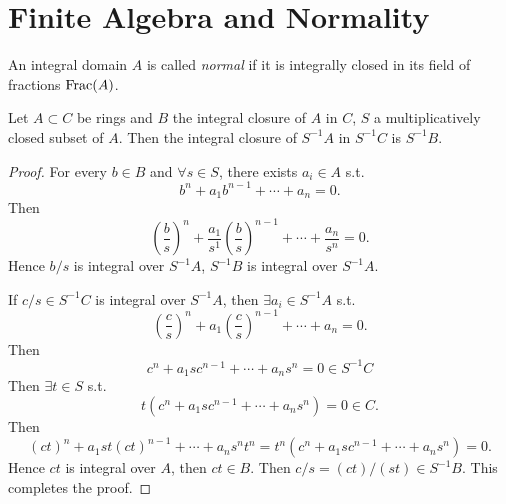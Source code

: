 \section{Finite Algebra and Normality }


    \begin{definition}\label{def: normal domain}
        An integral domain $A$ is called \textit{normal} if it is integrally closed in its field of fractions $\operatorname{Frac}(A)$.
    \end{definition}

    \begin{lemma}\label{lem: integral closed under localization}
        Let $A \subset C$ be rings and $B$ the integral closure of $A$ in $C$, $S$ a multiplicatively closed subset of $A$.
        Then the integral closure of  $S^{-1}A$ in $S^{-1}C$ is $S^{-1}B$.
    \end{lemma}
    \begin{proof}
            For every $b \in B$ and $\forall s \in S$, there exists $a_i \in A$ s.t. 
            \[ 
                b^n + a_1 b^{n-1} + \cdots + a_n = 0.
            \] 
            Then 
            \[ 
                \left( \frac{b}{s} \right)^n + \frac{a_1}{s^1} \left( \frac{b}{s} \right)^{n-1} + \cdots + \frac{a_n}{s^n} = 0.
            \] 
            Hence $b/s$ is integral over $S^{-1}A$, $S^{-1}B$ is integral over $S^{-1}A$.

            If $c/s \in S^{-1}C$ is integral over $S^{-1}A$, then $\exists a_i \in S^{-1}A$ s.t.
            \[ 
                \left( \frac{c}{s} \right)^n + a_1 \left( \frac{c}{s} \right)^{n-1} + \cdots + a_n = 0.
            \]
            Then 
            \[ 
                c^n + a_1 s c^{n-1} + \cdots + a_n s^n = 0 \in S^{-1}C
            \] 
            Then $\exists t \in S$ s.t. 
            \[
                t (c^n + a_1 s c^{n-1} + \cdots + a_n s^n) = 0 \in C.
            \] 
            Then 
            \[ 
                (ct)^n + a_1 s t (ct)^{n-1} + \cdots + a_n s^n t^n  = t^n (c^n + a_1 s c^{n-1} + \cdots + a_n s^n) = 0.
            \] 
            Hence $ct$ is integral over $A$, then $ct \in B$.
            Then $c/s = (ct)/(st) \in S^{-1}B$.
            This completes the proof.
    \end{proof}

